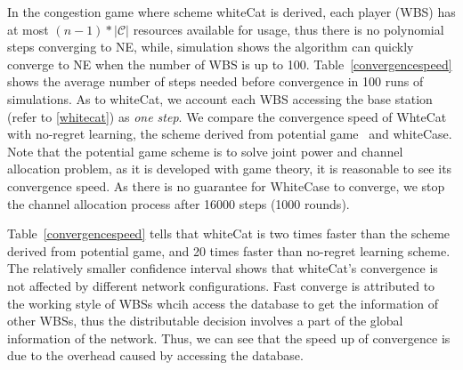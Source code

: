 In the congestion game where scheme whiteCat is derived, each player (WBS) has at most $(n-1)*|\mathcal{C}|$ resources available for usage, thus there is no polynomial steps converging to NE, while, simulation shows the algorithm can quickly converge to NE when the number of WBS is up to 100. 
%
Table~\ref{convergencespeed} shows the average number of steps needed before convergence in 100 runs of simulations.
As to whiteCat, we account each WBS accessing the base station (refer to \ref{whitecat}) as \textit{one step}.
We compare the convergence speed of WhteCat with no-regret learning, the scheme derived from potential game~\cite{pimrc_2012} and whiteCase.
Note that the potential game scheme is to solve joint power and channel allocation problem, as it is developed with game theory, it is reasonable to see its convergence speed.
As there is no guarantee for WhiteCase to converge, we stop the channel allocation process after 16000 steps (1000 rounds).

Table~\ref{convergencespeed} tells that whiteCat is two times faster than the scheme derived from potential game, and 20 times faster than no-regret learning scheme.
The relatively smaller confidence interval shows that whiteCat's convergence is not affected by different network configurations.
Fast converge is attributed to the working style of WBSs whcih access the database to get the information of other WBSs, thus the distributable decision involves a part of the global information of the network.
Thus, we can see that the speed up of convergence is due to the overhead caused by accessing the database.


